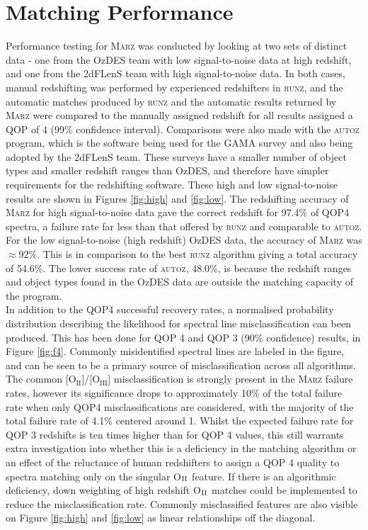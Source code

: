 \documentclass[iop]{emulateapj}
\newcommand{\runz}{\textsc{runz}}
\newcommand{\autoz}{\textsc{autoz}}
\newcommand{\marz}{\textsc{Marz}}
\begin{document}
\section{Matching Performance}

Performance testing for \marz{} was conducted by looking at two sets of distinct data - one from the OzDES team with low signal-to-noise data at high redshift, and one from the 2dFLenS team with high signal-to-noise data. In both cases, manual redshifting was performed by experienced redshifters in \runz{}, and the automatic matches produced by \runz{} and the automatic results returned by \marz{} were compared to the manually assigned redshift for all results assigned a QOP of 4 (99\% confidence interval). Comparisons were also made with the \autoz{} program, which is the software being used for the GAMA survey and also being adopted by the 2dFLenS team. These surveys have a smaller number of object types and smaller redshift ranges than OzDES, and therefore have simpler requirements for the redshifting software. These high and low signal-to-noise results are shown in Figures \ref{fig:high} and \ref{fig:low}. The redshifting accuracy of \marz{} for high signal-to-noise data gave the correct redshift for 97.4\% of QOP4 spectra, a failure rate far less than that offered by \runz{} and comparable to \autoz{}. For the low signal-to-noise (high redshift) OzDES data, the accuracy of \marz{} was $\approx 92$\%. This is in comparison to the best \runz{} algorithm giving a total accuracy of 54.6\%. The lower success rate of \autoz, 48.0\%, is because the redshift ranges and object types found in the OzDES data are outside the matching capacity of the program.\\

In addition to the QOP4 successful recovery rates, a normalised probability distribution describing the likelihood for spectral line misclassification can been produced. This has been done for QOP 4 and QOP 3 (90\% confidence) results, in Figure \ref{fig:f4}. Commonly misidentified spectral lines are labeled in the figure, and can be seen to be a primary source of misclassification across all algorithms. The common [O$_{\mathrm{II}}$]/[O$_{\mathrm{III}}$] misclassification is strongly present in the \marz{} failure rates, however its significance drops to approximately 10\% of the total failure rate when only QOP4 misclassifications are considered, with the majority of the total failure rate of 4.1\% centered around 1. Whilst the expected failure rate for QOP 3 redshifts is ten times higher than for QOP 4 values, this still warrants extra investigation into whether this is a deficiency in the matching algorithm or an effect of the reluctance of human redshifters to assign a QOP 4 quality to spectra matching only on the singular O$_{\rm{II}}$ feature. If there is an algorithmic deficiency, down weighting of high redshift O$_{\rm{II}}$ matches could be implemented to reduce the misclassification rate. Commonly misclassified features are also visible on Figure \ref{fig:high} and \ref{fig:low} as linear relationships off the diagonal.\\
\end{document}
